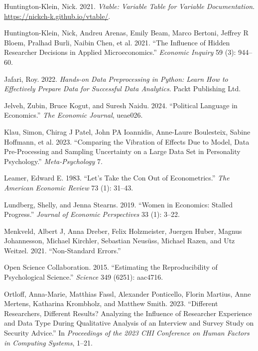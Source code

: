 \documentclass[
  letterpaper,
  DIV=11,
  numbers=noendperiod]{scrartcl}
\newlength{\cslhangindent}
\newlength{\cslentryspacingunit} %
\newenvironment{CSLReferences}[2] %
 {%
  \setlength{\parindent}{0pt}
  \ifodd #1
  \let\oldpar\par
  \def\par{\hangindent=\cslhangindent\oldpar}
  \fi
  \setlength{\parskip}{#2\cslentryspacingunit}
 }%
 {}
\begin{document}
\begin{CSLReferences}{1}{0}
\leavevmode{}%
Huntington-Klein, Nick. 2021. \emph{Vtable: Variable Table for Variable
Documentation}. \url{https://nickch-k.github.io/vtable/}.

\leavevmode{}%
Huntington-Klein, Nick, Andreu Arenas, Emily Beam, Marco Bertoni,
Jeffrey R Bloem, Pralhad Burli, Naibin Chen, et al. 2021. {``The
Influence of Hidden Researcher Decisions in Applied Microeconomics.''}
\emph{Economic Inquiry} 59 (3): 944--60.

\leavevmode{}%
Jafari, Roy. 2022. \emph{Hands-on Data Preprocessing in Python: Learn
How to Effectively Prepare Data for Successful Data Analytics}. Packt
Publishing Ltd.

\leavevmode{}%
Jelveh, Zubin, Bruce Kogut, and Suresh Naidu. 2024. {``Political
Language in Economics.''} \emph{The Economic Journal}, ueae026.

\leavevmode{}%
Klau, Simon, Chirag J Patel, John PA Ioannidis, Anne-Laure Boulesteix,
Sabine Hoffmann, et al. 2023. {``Comparing the Vibration of Effects Due
to Model, Data Pre-Processing and Sampling Uncertainty on a Large Data
Set in Personality Psychology.''} \emph{Meta-Psychology} 7.

\leavevmode{}%
Leamer, Edward E. 1983. {``Let's Take the Con Out of Econometrics.''}
\emph{The American Economic Review} 73 (1): 31--43.

\leavevmode{}%
Lundberg, Shelly, and Jenna Stearns. 2019. {``Women in Economics:
Stalled Progress.''} \emph{Journal of Economic Perspectives} 33 (1):
3--22.

\leavevmode{}%
Menkveld, Albert J, Anna Dreber, Felix Holzmeister, Juergen Huber,
Magnus Johannesson, Michael Kirchler, Sebastian Neusüss, Michael Razen,
and Utz Weitzel. 2021. {``Non-Standard Errors.''}

\leavevmode{}%
Open Science Collaboration. 2015. {``Estimating the Reproducibility of
Psychological Science.''} \emph{Science} 349 (6251): aac4716.

\leavevmode{}%
Ortloff, Anna-Marie, Matthias Fassl, Alexander Ponticello, Florin
Martius, Anne Mertens, Katharina Krombholz, and Matthew Smith. 2023.
{``Different Researchers, Different Results? Analyzing the Influence of
Researcher Experience and Data Type During Qualitative Analysis of an
Interview and Survey Study on Security Advice.''} In \emph{Proceedings
of the 2023 CHI Conference on Human Factors in Computing Systems},
1--21.


\end{CSLReferences}
\end{document}
